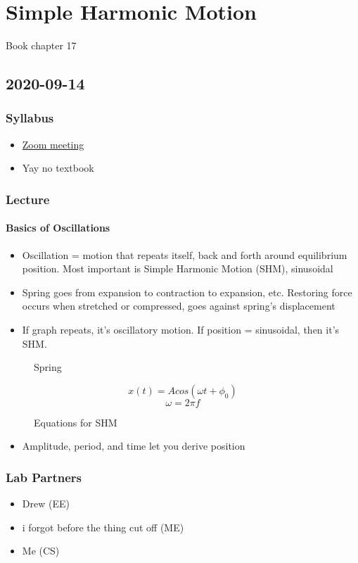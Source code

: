 \chapter{Simple Harmonic Motion}

Book chapter 17

\section{2020-09-14}

\subsection{Syllabus}

\begin{itemize}
    \item \href{https://calpoly.zoom.us/j/680327688}{Zoom meeting}
    \item Yay no textbook
\end{itemize}

\subsection{Lecture}

\subsubsection{Basics of Oscillations}

\begin{itemize}
    \item Oscillation = motion that repeats itself, back and forth around equilibrium position. Most important is Simple Harmonic Motion (SHM), sinusoidal
    \item Spring goes from expansion to contraction to expansion, etc. Restoring force occurs when stretched or compressed, goes against spring's displacement
    \item If graph repeats, it's oscillatory motion. If position = sinusoidal, then it's SHM. 
\end{itemize}

\begin{figure}[]
    \centering
    
    \caption{Spring}
\end{figure}

\begin{figure}[]
    \centering
    
    $$x(t) = Acos(\omega t + \phi_0)$$
    $$\omega = 2 \pi f$$
    
    \caption{Equations for SHM}
    \label{}
\end{figure}

\begin{itemize}
    \item Amplitude, period, and time let you derive position
\end{itemize}

\subsection{Lab Partners}

\begin{itemize}
    \item Drew (EE)
    \item i forgot before the thing cut off (ME)
    \item Me (CS)
\end{itemize}